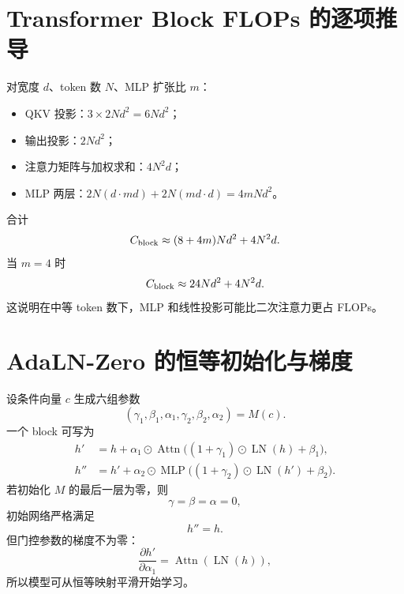\documentclass[UTF8,12pt,a4paper,fontset=none]{ctexart}
\numberwithin{equation}{section}
\begin{document}
\section{Transformer Block FLOPs 的逐项推导}
对宽度 $d$、token 数 $N$、MLP 扩张比 $m$：
\begin{itemize}
 \item QKV 投影：$3\times2Nd^2=6Nd^2$；
 \item 输出投影：$2Nd^2$；
 \item 注意力矩阵与加权求和：$4N^2d$；
 \item MLP 两层：$2N(d\cdot md)+2N(md\cdot d)=4mNd^2$。
\end{itemize}
合计
\begin{equation}
 C_{\rm block}\approx(8+4m)Nd^2+4N^2d.
\end{equation}
当 $m=4$ 时
\begin{equation}
 C_{\rm block}\approx24Nd^2+4N^2d.
\end{equation}
这说明在中等 token 数下，MLP 和线性投影可能比二次注意力更占 FLOPs。

\section{AdaLN-Zero 的恒等初始化与梯度}
设条件向量 $c$ 生成六组参数
\begin{equation}
 (\gamma_1,\beta_1,\alpha_1,
 \gamma_2,\beta_2,\alpha_2)=M(c).
\end{equation}
一个 block 可写为
\begin{align}
 h'&=h+\alpha_1\odot
 \operatorname{Attn}\bigl((1+\gamma_1)\odot\operatorname{LN}(h)+\beta_1\bigr),\\
 h''&=h'+\alpha_2\odot
 \operatorname{MLP}\bigl((1+\gamma_2)\odot\operatorname{LN}(h')+\beta_2\bigr).
\end{align}
若初始化 $M$ 的最后一层为零，则
\begin{equation}
 \gamma=\beta=\alpha=0,
\end{equation}
初始网络严格满足
\begin{equation}
 h''=h.
\end{equation}
但门控参数的梯度不为零：
\begin{equation}
 \frac{\partial h'}{\partial\alpha_1}
 =\operatorname{Attn}(\operatorname{LN}(h)),
\end{equation}
所以模型可从恒等映射平滑开始学习。
\end{document}
